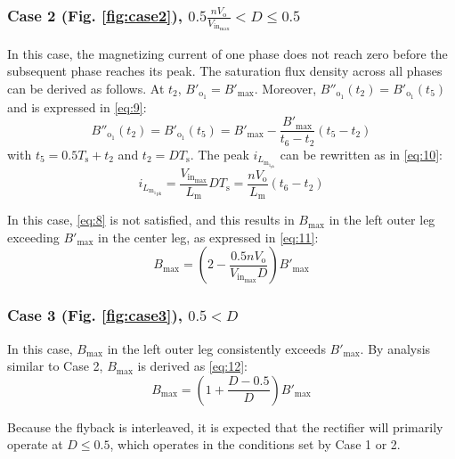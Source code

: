 \documentclass[lettersize,journal]{IEEEtran}
\begin{document}
\subsubsection*{\textup{Case 2 (Fig. \ref{fig:case2}), $0.5 \frac{n V_{\mathrm{o}}}{V_{\mathrm{in}_{\mathrm{max}}}} < D \le 0.5$}}
In this case, the magnetizing current of one phase does not reach zero before the subsequent phase reaches its peak. The saturation flux density across all phases can be derived as follows. At $t_2$, $B'_{\mathrm{o}_1} = B'_{\mathrm{max}}$. Moreover, $B''_{\mathrm{o}_1}(t_2) = B'_{\mathrm{o}_1}(t_5)$ and is expressed in \eqref{eq:9}:
\begin{equation}
\label{eq:9}
B''_{\mathrm{o}_1}(t_2) = B'_{\mathrm{o}_1}(t_5) = B'_{\mathrm{max}} - \frac{B'_{\mathrm{max}}}{t_6 - t_2}(t_5 - t_2)
\end{equation}
with $t_5 = 0.5 T_{\mathrm{s}} + t_2$ and $t_2 = D T_{\mathrm{s}}$. The peak $i_{L_{\mathrm{m}_{1_{\mathrm{pk}}}}}$ can be rewritten as in \eqref{eq:10}:
\begin{equation}
\label{eq:10}
i_{L_{{{\mathrm{m}_1}_{\mathrm{pk}}}}} = \frac{V_{\mathrm{in}_{\mathrm{max}}}}{L_{\mathrm{m}}} D T_{\mathrm{s}} = \frac{n V_{\mathrm{o}}}{L_{\mathrm{m}}}(t_6 - t_2)
\end{equation}

In this case, \eqref{eq:8} is not satisfied, and this results in $B_{\mathrm{max}}$ in the left outer leg exceeding $B'_{\mathrm{max}}$ in the center leg, as expressed in \eqref{eq:11}:
\begin{equation}
\label{eq:11}
B_{\mathrm{max}} = \left(2 - \frac{0.5 n V_{\mathrm{o}}}{V_{\mathrm{in}_{\mathrm{max}}} D}\right) B'_{\mathrm{max}}
\end{equation}

\subsubsection*{\textup{Case 3 (Fig. \ref{fig:case3}), $0.5 < D$}}
In this case, $B_{\mathrm{max}}$ in the left outer leg consistently exceeds $B'_{\mathrm{max}}$. By analysis similar to Case 2, $B_{\mathrm{max}}$ is derived as \eqref{eq:12}:
\begin{equation}
\label{eq:12}
B_{\mathrm{max}} = \left(1 + \frac{D - 0.5}{D}\right) B'_{\mathrm{max}}
\end{equation}

Because the flyback is interleaved, it is expected that the rectifier will primarily operate at $D \le 0.5$, which operates in the conditions set by Case 1 or 2.
\end{document}
